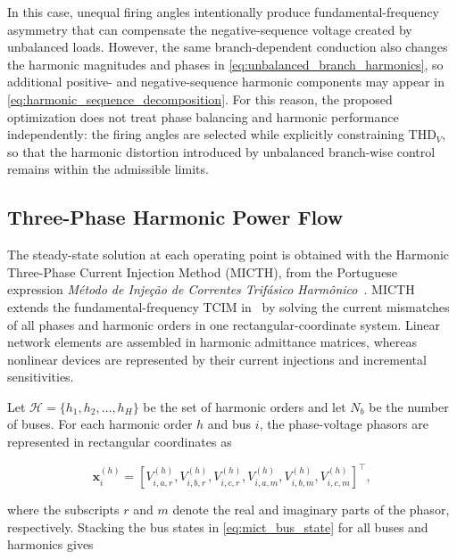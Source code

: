 \documentclass[journal]{IEEEtran}
\begin{document}
\noindent In this case, unequal firing angles intentionally produce
fundamental-frequency asymmetry that can compensate the negative-sequence
voltage created by unbalanced loads. However, the same branch-dependent
conduction also changes the harmonic magnitudes and phases in
\eqref{eq:unbalanced_branch_harmonics}, so additional positive- and
negative-sequence harmonic components may appear in
\eqref{eq:harmonic_sequence_decomposition}. For this reason, the proposed
optimization does not treat phase balancing and harmonic performance
independently: the firing angles are selected while explicitly constraining
THD$_V$, so that the harmonic distortion introduced by unbalanced branch-wise
control remains within the admissible limits.

\subsection{Three-Phase Harmonic Power Flow}
\label{subsec:hpf}

The steady-state solution at each operating point is obtained with the
Harmonic Three-Phase Current Injection Method (MICTH), from the Portuguese
expression \textit{M\'etodo de Inje\c{c}\~ao de Correntes Trif\'asico
Harm\^onico}~\cite{Arruda2003}. MICTH extends the fundamental-frequency TCIM
in~\cite{garcia2000three} by solving the current mismatches of all phases and
harmonic orders in one rectangular-coordinate system. Linear network elements
are assembled in harmonic admittance matrices, whereas nonlinear devices are
represented by their current injections and incremental sensitivities.

Let $\mathcal{H}=\{h_1,h_2,\ldots,h_H\}$ be the set of harmonic orders and
let $N_b$ be the number of buses. For each harmonic order $h$ and bus $i$,
the phase-voltage phasors are represented in rectangular coordinates as

\begin{equation}
    \mathbf{x}_{i}^{(h)} =
    \left[
    V_{i,a,r}^{(h)}, V_{i,b,r}^{(h)}, V_{i,c,r}^{(h)},
    V_{i,a,m}^{(h)}, V_{i,b,m}^{(h)}, V_{i,c,m}^{(h)}
    \right]^{\top},
    \label{eq:mict_bus_state}
\end{equation}

\noindent where the subscripts $r$ and $m$ denote the real and imaginary
parts of the phasor, respectively. Stacking the bus states in
\eqref{eq:mict_bus_state} for all buses and harmonics gives
\end{document}
